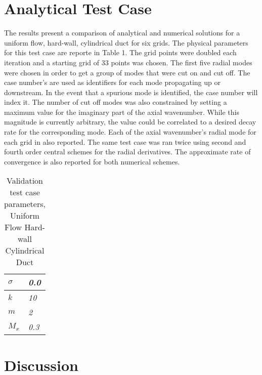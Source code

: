 
\section{Analytical Test Case}
The results present a comparison of analytical and numerical solutions for a
uniform flow, hard-wall, cylindrical duct for six grids. The physical 
parameters for this test case are reporte in Table 1. The grid points were
doubled each iteration and a starting grid of 33 points was chosen. The 
first five radial modes were chosen in order to get a group of modes that were cut
on and cut off. The case number's are used as identifiers for each 
mode propagating up or downstream. In the event that a spurious mode is identified,
the case number will index it.  The number of cut off modes was also constrained
by setting a maximum value for the imaginary part of the axial wavenumber. 
While this magnitude is currently arbitrary, the value could be correlated to a
desired decay rate for the corresponding mode. Each of the axial wavenumber's 
radial mode for each grid in also reported. The same test case was ran twice using 
second and fourth order central schemes for the radial derivatives.  The 
approximate rate of convergence is also reported for both numerical schemes.
\begin{table}[!h]
    \centering
    \begin{tabular}{|l|l|}
        \hline
        $\sigma$ & \textit{0.0} \\ \hline
        $k$      & \textit{10}   \\ \hline
        $m$      & \textit{2}    \\ \hline
        $M_x$    & \textit{0.3}  \\ \hline
    \end{tabular}
    \caption{Validation test case parameters, Uniform Flow Hard-wall Cylindrical%
    Duct} 
\end{table}

\newpage

\section{Discussion}





